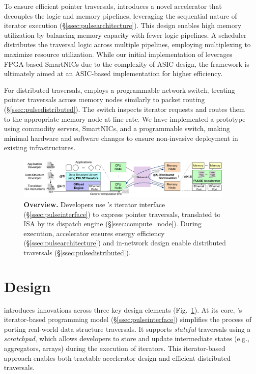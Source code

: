 To ensure efficient pointer traversals, \pulse introduces a novel accelerator that decouples the logic and memory pipelines, leveraging the sequential nature of iterator execution (\S\ref{ssec:pulsearchitecture}). This design enables high memory utilization by balancing memory capacity with fewer logic pipelines. A scheduler distributes the traversal logic across multiple pipelines, employing multiplexing to maximize resource utilization. While our initial implementation of \pulse leverages FPGA-based SmartNICs due to the complexity of ASIC design, the framework is ultimately aimed at an ASIC-based implementation for higher efficiency.

For distributed traversals, \pulse employs a programmable network switch, treating pointer traversals across memory nodes similarly to packet routing (\S\ref{ssec:pulsedistributed}). The switch inspects iterator requests and routes them to the appropriate memory node at line rate. We have implemented a prototype using commodity servers, SmartNICs, and a programmable switch, making minimal hardware and software changes to ensure non-invasive deployment in existing infrastructures.






\begin{figure}[ht!]
  \centering
  \includegraphics[width=0.95\textwidth]{fig/pulse/overview.pdf}
  \caption[\pulse Overview]{\textbf{\pulse Overview.} Developers use \pulse's iterator interface (\S\ref{ssec:pulseinterface}) to express pointer traversals, translated to \pulse ISA by its dispatch engine (\S\ref{ssec:compute_node}). During execution, \pulse accelerator ensures energy efficiency (\S\ref{ssec:pulsearchitecture}) and in-network design enable distributed traversals (\S\ref{ssec:pulsedistributed}).} 
  \label{fig:general}
\end{figure}


\section{\pulse Design}
\label{sec:pulsedesign}
\pulse introduces innovations across three key design elements (Fig.~\ref{fig:general}). At its core, \pulse's iterator-based programming model (\S\ref{ssec:pulseinterface}) simplifies the process of porting real-world data structure traversals. It supports \emph{stateful} traversals using a \emph{scratchpad}, which allows developers to store and update intermediate states (e.g., aggregators, arrays) during the execution of iterators. This iterator-based approach enables both tractable accelerator design and efficient distributed traversals.


